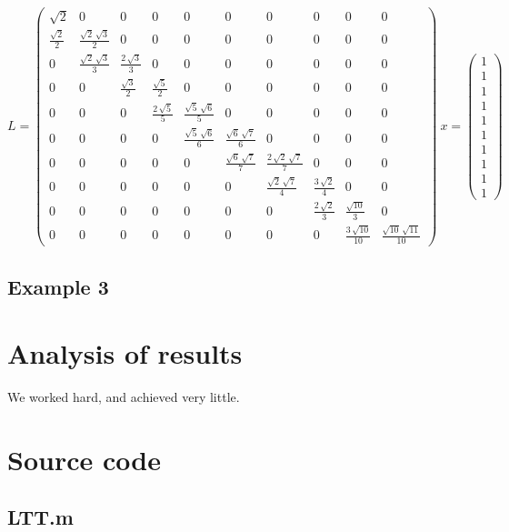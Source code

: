 \documentclass[12pt]{article}
\begin{document}
$$L=\left(\begin{array}{cccccccccc} \sqrt{2} & 0 & 0 & 0 & 0 & 0 & 0 & 0 & 0 & 0\\ \frac{\sqrt{2}}{2} & \frac{\sqrt{2}\,\sqrt{3}}{2} & 0 & 0 & 0 & 0 & 0 & 0 & 0 & 0\\ 0 & \frac{\sqrt{2}\,\sqrt{3}}{3} & \frac{2\,\sqrt{3}}{3} & 0 & 0 & 0 & 0 & 0 & 0 & 0\\ 0 & 0 & \frac{\sqrt{3}}{2} & \frac{\sqrt{5}}{2} & 0 & 0 & 0 & 0 & 0 & 0\\ 0 & 0 & 0 & \frac{2\,\sqrt{5}}{5} & \frac{\sqrt{5}\,\sqrt{6}}{5} & 0 & 0 & 0 & 0 & 0\\ 0 & 0 & 0 & 0 & \frac{\sqrt{5}\,\sqrt{6}}{6} & \frac{\sqrt{6}\,\sqrt{7}}{6} & 0 & 0 & 0 & 0\\ 0 & 0 & 0 & 0 & 0 & \frac{\sqrt{6}\,\sqrt{7}}{7} & \frac{2\,\sqrt{2}\,\sqrt{7}}{7} & 0 & 0 & 0\\ 0 & 0 & 0 & 0 & 0 & 0 & \frac{\sqrt{2}\,\sqrt{7}}{4} & \frac{3\,\sqrt{2}}{4} & 0 & 0\\ 0 & 0 & 0 & 0 & 0 & 0 & 0 & \frac{2\,\sqrt{2}}{3} & \frac{\sqrt{10}}{3} & 0\\ 0 & 0 & 0 & 0 & 0 & 0 & 0 & 0 & \frac{3\,\sqrt{10}}{10} & \frac{\sqrt{10}\,\sqrt{11}}{10} \end{array}\right)\
x=\left(\begin{array}{c} 1\\ 1\\ 1\\ 1\\ 1\\ 1\\ 1\\ 1\\ 1\\ 1 \end{array}\right)
$$
\subsection{Example 3}

\section{Analysis of results}
We worked hard, and achieved very little.

\section{Source code}
\subsection{LTT.m}

\end{document}
